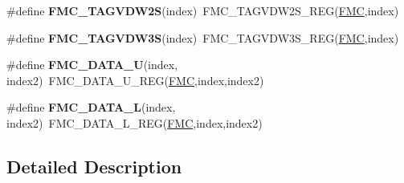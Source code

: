 \begin{DoxyCompactItemize}
\item 
\#define {\bfseries F\+M\+C\+\_\+\+T\+A\+G\+V\+D\+W2S}(index)~F\+M\+C\+\_\+\+T\+A\+G\+V\+D\+W2\+S\+\_\+\+R\+EG(\hyperlink{group__FMC__Peripheral__Access__Layer_ga970254e6dadedc433f57d43709636664}{F\+MC},index)\hypertarget{group__FMC__Register__Accessor__Macros_ga08a172b0ee7228b03453ec0dfecf081c}{}\label{group__FMC__Register__Accessor__Macros_ga08a172b0ee7228b03453ec0dfecf081c}

\item 
\#define {\bfseries F\+M\+C\+\_\+\+T\+A\+G\+V\+D\+W3S}(index)~F\+M\+C\+\_\+\+T\+A\+G\+V\+D\+W3\+S\+\_\+\+R\+EG(\hyperlink{group__FMC__Peripheral__Access__Layer_ga970254e6dadedc433f57d43709636664}{F\+MC},index)\hypertarget{group__FMC__Register__Accessor__Macros_gad7465a3ae84cfdb0bec808294dbfd388}{}\label{group__FMC__Register__Accessor__Macros_gad7465a3ae84cfdb0bec808294dbfd388}

\item 
\#define {\bfseries F\+M\+C\+\_\+\+D\+A\+T\+A\+\_\+U}(index,  index2)~F\+M\+C\+\_\+\+D\+A\+T\+A\+\_\+\+U\+\_\+\+R\+EG(\hyperlink{group__FMC__Peripheral__Access__Layer_ga970254e6dadedc433f57d43709636664}{F\+MC},index,index2)\hypertarget{group__FMC__Register__Accessor__Macros_gaa109b4be3b81d18c8d2c5b9afa04ff6f}{}\label{group__FMC__Register__Accessor__Macros_gaa109b4be3b81d18c8d2c5b9afa04ff6f}

\item 
\#define {\bfseries F\+M\+C\+\_\+\+D\+A\+T\+A\+\_\+L}(index,  index2)~F\+M\+C\+\_\+\+D\+A\+T\+A\+\_\+\+L\+\_\+\+R\+EG(\hyperlink{group__FMC__Peripheral__Access__Layer_ga970254e6dadedc433f57d43709636664}{F\+MC},index,index2)\hypertarget{group__FMC__Register__Accessor__Macros_gab67d123b384d58b8f86096b79e1f06f6}{}\label{group__FMC__Register__Accessor__Macros_gab67d123b384d58b8f86096b79e1f06f6}

\end{DoxyCompactItemize}


\subsection{Detailed Description}
